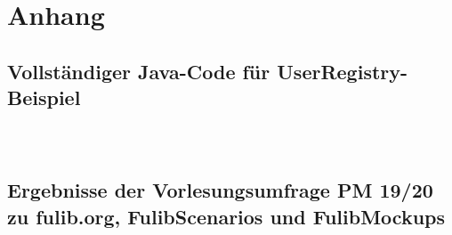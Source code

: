\chapter{Anhang}\label{ch:appendix}

\section{Vollständiger Java-Code für UserRegistry-Beispiel}\label{sec:user-registry-full}

\begin{center}
    \inputminted[breaklines]{java}{chapter/fulib-scenarios/java/User.java}

    \inputminted[breaklines]{java}{chapter/fulib-scenarios/java/UserRegistry.java}

    \inputminted[breaklines]{java}{chapter/fulib-scenarios/java/UserRegistryTest.java}
\end{center}

\section{Ergebnisse der Vorlesungsumfrage PM 19/20 zu fulib.org, FulibScenarios und FulibMockups}\label{sec:survey-results}

